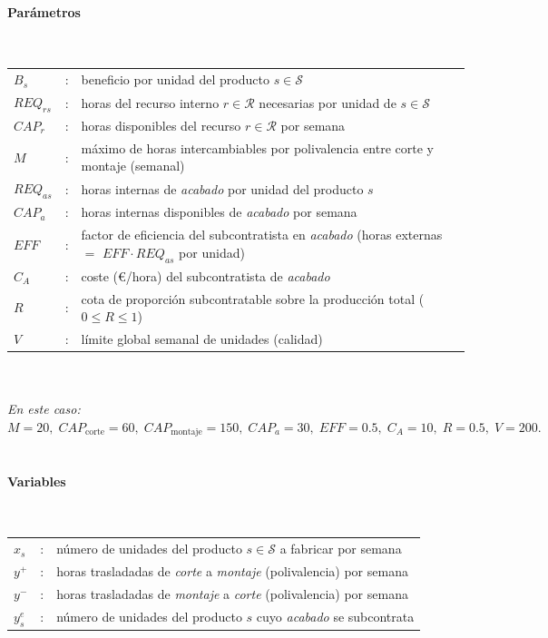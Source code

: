 \paragraph{Parámetros}\mbox{}\\
\begin{tabular}{l c l}
    $B_s$              & : & beneficio por unidad del producto $s \in \mathcal{S}$\\
    $REQ_{r s}$        & : & horas del recurso interno $r \in \mathcal{R}$ necesarias por unidad de $s \in \mathcal{S}$\\
    $CAP_r$            & : & horas disponibles del recurso $r \in \mathcal{R}$ por semana\\
    $M$                & : & máximo de horas intercambiables por polivalencia entre corte y montaje (semanal)\\
    $REQ_{a s}$        & : & horas internas de \textit{acabado} por unidad del producto $s$\\
    $CAP_a$            & : & horas internas disponibles de \textit{acabado} por semana\\
    $EFF$              & : & factor de eficiencia del subcontratista en \textit{acabado} (horas externas $=$ $EFF \cdot REQ_{a s}$ por unidad)\\
    $C_A$              & : & coste (€/hora) del subcontratista de \textit{acabado}\\
    $R$                & : & cota de proporción subcontratable sobre la producción total ($0 \le R \le 1$)\\
    $V$                & : & límite global semanal de unidades (calidad)\\
\end{tabular}
\\
\\
\textit{En este caso: } $M{=}20,\; CAP_{\text{corte}}{=}60,\; CAP_{\text{montaje}}{=}150,\; CAP_a{=}30,\; EFF{=}0.5,\; C_A{=}10,\; R{=}0.5,\; V{=}200.$
\\
\\

\paragraph{Variables}\mbox{}\\
\begin{tabular}{l c l}
    $x_s$     & : & número de unidades del producto $s \in \mathcal{S}$ a fabricar por semana\\
    $y^+$     & : & horas trasladadas de \textit{corte} a \textit{montaje} (polivalencia) por semana\\
    $y^-$     & : & horas trasladadas de \textit{montaje} a \textit{corte} (polivalencia) por semana\\
    $y_s^{e}$ & : & número de unidades del producto $s$ cuyo \textit{acabado} se subcontrata\\
\end{tabular}
\\
\\

